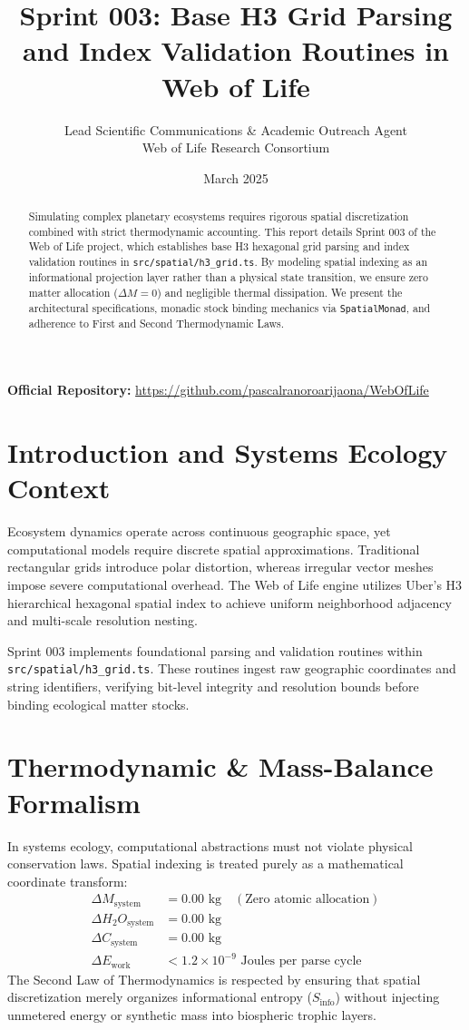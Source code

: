 \documentclass[11pt, a4paper]{article}
\title{\textbf{Sprint 003: Base H3 Grid Parsing and Index Validation Routines in Web of Life}}
\author{Lead Scientific Communications \& Academic Outreach Agent \\ Web of Life Research Consortium}
\date{March 2025}
\begin{document}
\maketitle

\begin{abstract}
Simulating complex planetary ecosystems requires rigorous spatial discretization combined with strict thermodynamic accounting. This report details Sprint 003 of the Web of Life project, which establishes base H3 hexagonal grid parsing and index validation routines in \texttt{src/spatial/h3\_grid.ts}. By modeling spatial indexing as an informational projection layer rather than a physical state transition, we ensure zero matter allocation ($\Delta M = 0$) and negligible thermal dissipation. We present the architectural specifications, monadic stock binding mechanics via \texttt{SpatialMonad}, and adherence to First and Second Thermodynamic Laws.
\end{abstract}

\noindent\textbf{Official Repository:} \url{https://github.com/pascalranoroarijaona/WebOfLife}

\section{Introduction and Systems Ecology Context}
Ecosystem dynamics operate across continuous geographic space, yet computational models require discrete spatial approximations. Traditional rectangular grids introduce polar distortion, whereas irregular vector meshes impose severe computational overhead. The Web of Life engine utilizes Uber's H3 hierarchical hexagonal spatial index to achieve uniform neighborhood adjacency and multi-scale resolution nesting.

Sprint 003 implements foundational parsing and validation routines within \texttt{src/spatial/h3\_grid.ts}. These routines ingest raw geographic coordinates and string identifiers, verifying bit-level integrity and resolution bounds before binding ecological matter stocks.

\section{Thermodynamic \& Mass-Balance Formalism}
In systems ecology, computational abstractions must not violate physical conservation laws. Spatial indexing is treated purely as a mathematical coordinate transform:
\begin{align}
  \Delta M_{\text{system}} &= 0.00 \text{ kg} \quad (\text{Zero atomic allocation}) \\
  \Delta H_2O_{\text{system}} &= 0.00 \text{ kg} \\
  \Delta C_{\text{system}} &= 0.00 \text{ kg} \\
  \Delta E_{\text{work}} &< 1.2 \times 10^{-9} \text{ Joules per parse cycle}
\end{align}
The Second Law of Thermodynamics is respected by ensuring that spatial discretization merely organizes informational entropy ($S_{\text{info}}$) without injecting unmetered energy or synthetic mass into biospheric trophic layers.
\end{document}
